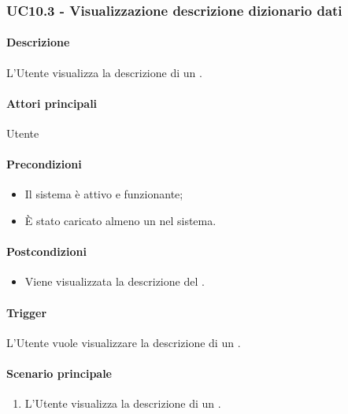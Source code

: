 
\subsubsection{UC10.3 - Visualizzazione descrizione dizionario dati}\label{UC10point3}
\paragraph*{Descrizione}
L'Utente visualizza la descrizione di un .

\paragraph*{Attori principali}
Utente

\paragraph*{Precondizioni}
\begin{itemize}
  \item Il sistema è attivo e funzionante;
  \item È stato caricato almeno un  nel sistema. 
\end{itemize}

\paragraph*{Postcondizioni}
\begin{itemize}
  \item Viene visualizzata la descrizione del .
\end{itemize}

\paragraph*{Trigger}
L'Utente vuole visualizzare la descrizione di un .

\paragraph*{Scenario principale}
\begin{enumerate}
  \item L'Utente visualizza la descrizione di un .
\end{enumerate}

